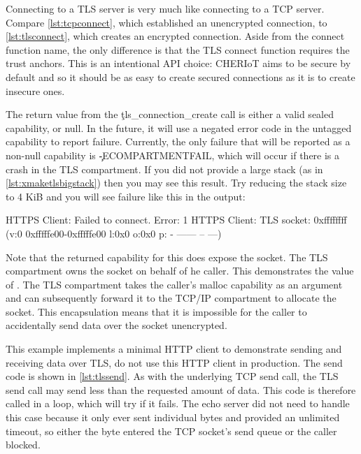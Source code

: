 \codelisting[filename=examples/tls/https.cc,marker=setup,label=lst:tlssetup,caption="Setup required before a TLS connection is possible."]{}

Connecting to a TLS server is very much like connecting to a TCP server.
Compare \ref{lst:tcpconnect}, which established an unencrypted connection, to \ref{lst:tlsconnect}, which creates an encrypted connection.
Aside from the connect function name, the only difference is that the TLS connect function requires the trust anchors.
This is an intentional API choice: CHERIoT aims to be secure by default and so it should be as easy to create secured connections as it is to create insecure ones.

\codelisting[filename=examples/tls/https.cc,marker=tls_connect,label=lst:tlsconnect,caption="Connecting to a remote server with TLS."]{}

The return value from the \c{tls_connection_create} call is either a valid sealed capability, or null.
In the future, it will use a negated error code in the untagged capability to report failure.
Currently, the only failure that will be reported as a non-null capability is \c{-ECOMPARTMENTFAIL}, which will occur if there is a crash in the TLS compartment.
If you did not provide a large stack (as in \ref{lst:xmaketlsbigstack}) then you may see this result.
Try reducing the stack size to 4 KiB and you will see failure like this in the output:

\begin{console}
HTTPS Client: Failed to connect.  Error: 1
HTTPS Client: TLS socket: 0xffffffff (v:0 0xfffffe00-0xfffffe00 l:0x0 o:0x0 p: - ------ -- ---)
\end{console}

Note that the returned capability for this does  expose the socket.
The TLS compartment owns the socket on behalf of he caller.
This demonstrates the value of .
The TLS compartment takes the caller's malloc capability as an argument and can subsequently forward it to the TCP/IP compartment to allocate the socket.
This encapsulation means that it is impossible for the caller to accidentally send data over the socket unencrypted.

This example implements a minimal HTTP client to demonstrate sending and receiving data over TLS, do not use this HTTP client in production.
The send code is shown in \ref{lst:tlssend}.
As with the underlying TCP send call, the TLS send call may send less than the requested amount of data.
This code is therefore called in a loop, which will try if it fails.
The echo server did not need to handle this case because it only ever sent individual bytes and provided an unlimited timeout, so either the byte entered the TCP socket's send queue or the caller blocked.

